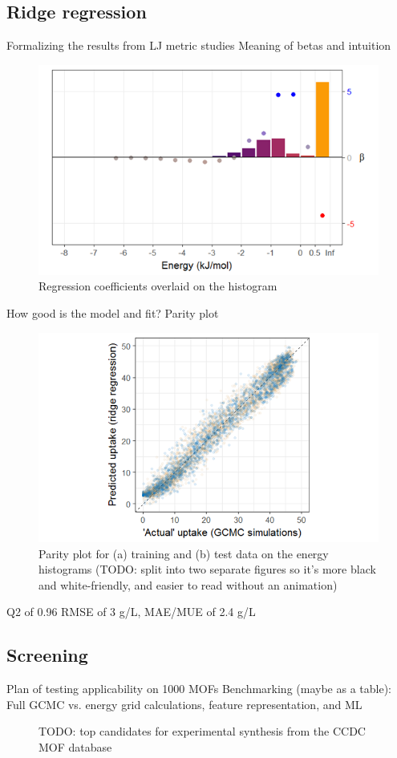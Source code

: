 \documentclass[letterpaper]{article}
\begin{document}
\subsection{Ridge regression}
\begin{outline}
	\1 Formalizing the results from LJ metric studies
	\1 Meaning of betas and intuition
	\begin{figure}[!ht]
		\centering
		\includegraphics[width=0.75\columnwidth]{Figs/betas.png}
		\caption{Regression coefficients overlaid on the histogram}
		\label{fig:betas}
	\end{figure}
	\1 How good is the model and fit?
		\2 Parity plot
		\begin{figure}[!ht]
			\centering
			\includegraphics[width=0.75\columnwidth]{Figs/parity.png}
			\caption{Parity plot for (a) training and (b) test data on the energy histograms (TODO: split into two separate figures so it's more black and white-friendly, and easier to read without an animation)}
			\label{fig:parity}
		\end{figure}
		\2 Q2 of 0.96
		\2 RMSE of 3 g/L, MAE/MUE of 2.4 g/L
\end{outline}


\subsection{Screening}
\begin{outline}
	\1 Plan of testing applicability on 1000 MOFs
	\1 Benchmarking (maybe as a table): Full GCMC vs. energy grid calculations, feature representation, and ML
\end{outline}
\begin{figure}[!ht]
	\centering
	\caption{TODO: top candidates for experimental synthesis from the CCDC MOF database}
	\label{fig:candidates}
\end{figure}
\end{document}
